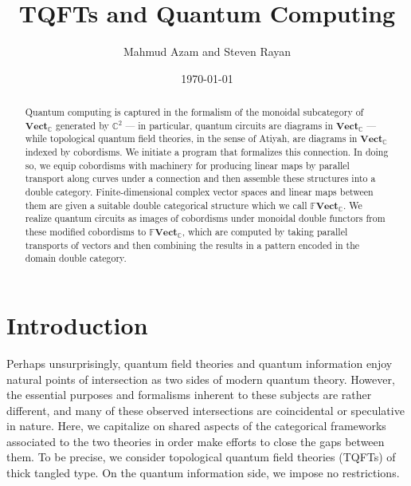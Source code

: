 \documentclass{amsart}
\newcommand{\C}{\mathbb{C}}
\newcommand{\Vect}{\textbf{Vect}}
\newcommand{\FFVect}{\mathbb{F}\textbf{Vect}}
\numberwithin{thm}{section}
\theoremstyle{definition}
\begin{document}
%

\title[TQFTs and Quantum Computing]{TQFTs and Quantum Computing}
\author{Mahmud Azam and Steven Rayan}
\date{\today}

\address{Centre for Quantum Topology and Its Applications (quanTA) and Department of Mathematics \& Statistics, University of Saskatchewan, McLean Hall, 106 Wiggins Road, Saskatoon, SK, CANADA S7N 5E6}


%

\begin{abstract}
Quantum computing is captured in the formalism of the monoidal subcategory of
$\Vect_{\C}$ generated by $\C^2$ --- in particular, quantum circuits are diagrams
in $\Vect_{\C}$ --- while topological quantum field theories, in the sense of
Atiyah, are diagrams in $\Vect_{\C}$ indexed by cobordisms. We initiate a program
that formalizes this connection. In doing so, we equip cobordisms with
machinery for producing linear maps by parallel transport along curves under a
connection and then assemble these structures into a double category. Finite-dimensional complex vector spaces and linear maps between them are given a
suitable double categorical structure which we call $\FFVect_{\C}$. We
realize quantum circuits as images of cobordisms under monoidal double functors
from these modified cobordisms to $\FFVect_{\C}$, which are computed by taking
parallel transports of vectors and then combining the results in a pattern
encoded in the domain double category.
\end{abstract}

\maketitle

\tableofcontents

%

\section{Introduction}

Perhaps unsurprisingly, quantum field theories and quantum information enjoy natural points of intersection as two sides of modern quantum theory.  However, the essential purposes and formalisms inherent to these subjects are rather different, and many of these observed intersections are coincidental or speculative in nature.  Here, we capitalize on shared aspects of the categorical frameworks associated to the two theories in order make efforts to close the gaps between them.  To be precise, we consider topological quantum field theories (TQFTs) of thick tangled type.  On the quantum information side, we impose no restrictions.
\end{document}
